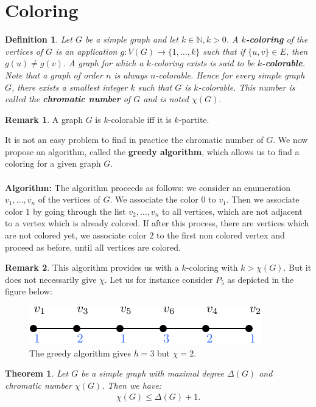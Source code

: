 \documentclass[12pt,a4paper]{article}
\newtheorem{thm}{Theorem}[section]
\newtheorem{defn}{Definition}[section]
\theoremstyle{definition}
\newtheorem{rem}{Remark}[section]
\begin{document}
\section{Coloring}
\begin{defn} Let $G$ be a simple graph and let $k \in \mathbb{N}, k >0$. A \textbf{$k$-coloring} of the vertices of $G$ is an application $g: V(G) \to \{1, \dots ,  k \}$ such that if $\{u,v\} \in E$, then $g(u) \neq g(v)$. A graph for which a $k$-coloring exists is said to be \textbf{$k$-colorable}. Note that a graph of order $n$ is always $n$-colorable. Hence for every simple graph $G$, there exists a smallest integer $k$ such that $G$ is $k$-colorable. This number is called the \textbf{chromatic number} of $G$ and is noted $\chi(G)$. 
\end{defn}
\begin{rem} A graph $G$ is $k$-colorable iff it is $k$-partite.
\end{rem}
It is not an easy problem to find in practice the chromatic number of $G$. We now propose an algorithm,  called the \textbf{greedy algorithm}, which allows us to find a coloring for a given graph $G$. 
\\\\
\textbf{Algorithm:} The algorithm proceeds as follows: we consider an enumeration $v_1, \dots , v_n$ of the vertices of $G$. We associate the color $0$ to $v_1$. Then we associate color $1$ by going through the list $v_2, \dots , v_n$ to all vertices, which are not adjacent to a vertex which is already colored. If after this process, there are vertices which are not colored yet, we associate color $2$ to the first non colored vertex and proceed as before, until all vertices are colored. 
\begin{rem}
This algorithm provides us with a $k$-coloring with $k > \chi(G)$. But it does not necessarily give $\chi$. Let us for instance consider $P_5$ as depicted in the figure below: 
\begin{figure}[hbtp]
\centering
\includegraphics[scale=1]{images/graph26.pdf}
\caption{The greedy algorithm gives $h=3$ but $\chi=2$. }
\end{figure}
\end{rem}
\begin{thm} Let $G$ be a simple graph with maximal degree $\Delta(G)$ and chromatic number $\chi(G)$. Then we have:
\begin{align*}
\chi(G) \leq \Delta(G) +1. 
\end{align*}
\end{thm}
\end{document}
